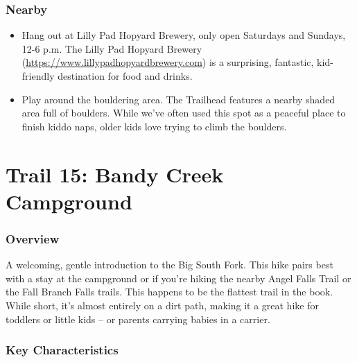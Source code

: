 \documentclass[
  letterpaper,
  DIV=11,
  numbers=noendperiod]{scrreprt}
\providecommand{\tightlist}{%
  \setlength{\itemsep}{0pt}\setlength{\parskip}{0pt}}\usepackage{longtable,booktabs,array}
\begin{document}
\subsection{Nearby}\label{nearby-13}

\begin{itemize}
\tightlist
\item
  Hang out at Lilly Pad Hopyard Brewery, only open Saturdays and
  Sundays, 12-6 p.m. The Lilly Pad Hopyard Brewery
  (\url{https://www.lillypadhopyardbrewery.com}) is a surprising,
  fantastic, kid-friendly destination for food and drinks.
\item
  Play around the bouldering area. The Trailhead features a nearby
  shaded area full of boulders. While we've often used this spot as a
  peaceful place to finish kiddo naps, older kids love trying to climb
  the boulders.
\end{itemize}

\chapter{Trail 15: Bandy Creek
Campground}\label{trail-15-bandy-creek-campground}

\subsection{Overview}\label{overview-15}

A welcoming, gentle introduction to the Big South Fork. This hike pairs
best with a stay at the campground or if you're hiking the nearby Angel
Falls Trail or the Fall Branch Falls trails. This happens to be the
flattest trail in the book. While short, it's almost entirely on a dirt
path, making it a great hike for toddlers or little kids -- or parents
carrying babies in a carrier.

\subsection{Key Characteristics}\label{key-characteristics-15}
\end{document}
